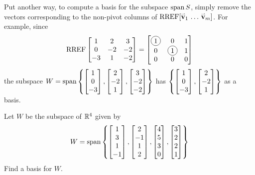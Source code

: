 \begin{applicationActivities}
\begin{fact}
  Put another way, to compute a basis for the subspace \(\operatorname{span} S\),
  simply remove the vectors corresponding to the non-pivot columns of
  \(\operatorname{RREF}[\mathbf{\accentset{\rightharpoonup}{v}}_1\,\dots\,\mathbf{\accentset{\rightharpoonup}{v}}_m]\).
  For example, since
  \[
    \RREF
    \begin{bmatrix}
      1 & 2 & 3 \\
      0 & -2 & -2 \\
      -3 & 1 & -2
    \end{bmatrix}
      =
    \begin{bmatrix}
      \circledNumber{1} & 0 & 1 \\
      0 & \circledNumber{1} & 1 \\
      0 & 0 & 0
    \end{bmatrix}
  \]
  the subspace
  \(
    W=\operatorname{span}\left\{
      \begin{bmatrix}1\\0\\-3\end{bmatrix},
      \begin{bmatrix}2\\-2\\1\end{bmatrix},
      \begin{bmatrix}3\\-2\\-2\end{bmatrix}
    \right\}
  \)
  has
  \(
    \left\{
      \begin{bmatrix}1\\0\\-3\end{bmatrix},
      \begin{bmatrix}2\\-2\\1\end{bmatrix}
    \right\}
  \)
  as a basis.
\end{fact}

\begin{activity}{10}
Let \(W\) be the subspace of \(\mathbb{R}^4\) given by
 \[W = \operatorname{span} \left\{
 \begin{bmatrix} 1 \\ 3 \\ 1 \\ -1 \end{bmatrix},
 \begin{bmatrix} 2 \\ -1 \\ 1 \\ 2 \end{bmatrix},
 \begin{bmatrix} 4 \\ 5 \\ 3 \\ 0 \end{bmatrix},
 \begin{bmatrix} 3 \\ 2 \\ 2 \\ 1 \end{bmatrix}
 \right\} \]
 Find a basis for \(W\).
\end{activity}


\end{applicationActivities}
